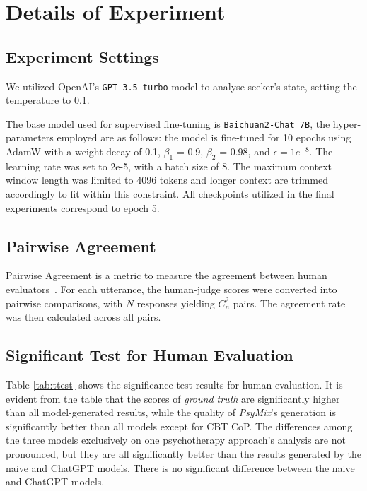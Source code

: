 \section{Details of Experiment}
\label{apd:experiment}

\subsection{Experiment Settings}
We utilized OpenAI's \texttt{GPT-3.5-turbo} model to analyse seeker's state, setting the temperature to 0.1. 

The base model used for supervised fine-tuning is \texttt{Baichuan2-Chat 7B}, the hyper-parameters employed are as follows: the model is fine-tuned for 10 epochs using AdamW with a weight decay of 0.1, $\beta_1$ = 0.9, $\beta_2$ = 0.98, and $\epsilon = 1e^{-8}$. The learning rate was set to 2e-5, with a batch size of 8. 
The maximum context window length was limited to 4096 tokens and longer context are trimmed accordingly to fit within this constraint.
All checkpoints utilized in the final experiments correspond to epoch 5.

\subsection{Pairwise Agreement}
\label{apd:agreement}
Pairwise Agreement is a metric to measure the agreement between human evaluators~\cite{liu2023alignbench}. For each utterance, the human-judge scores were converted into pairwise comparisons, with $N$ responses yielding $C_n^2$ pairs. The agreement rate was then calculated across all pairs.  

\subsection{Significant Test for Human Evaluation}
\label{sec:ttest}
Table \ref{tab:ttest} shows the significance test results for human evaluation. It is evident from the table that the scores of \textit{ground truth} are significantly higher than all model-generated results, while the quality of \textit{PsyMix}'s generation is significantly better than all models except for CBT CoP. The differences among the three models exclusively on one psychotherapy approach's analysis are not pronounced, but they are all significantly better than the results generated by the naive and ChatGPT models. There is no significant difference between the naive and ChatGPT models.

